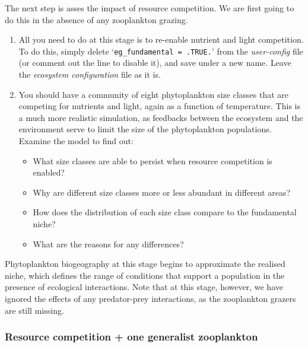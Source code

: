 \documentclass[11pt,fleqn]{book} %
\begin{document}
The next step is asses the impact of resource competition. We are first going to do this in the absence of any zooplankton grazing.

\begin{enumerate}[noitemsep]
\vspace{1mm}
\item All you need to do at this stage is to re-enable nutrient and light competition. To do this, simply delete `\texttt{eg\_fundamental~=~.TRUE.}' from the \textit{user-config} file (or comment out the line to disable it), and save under a new name. Leave the \textit{ecosystem configuration} file as it is.

\vspace{1mm}
\item You should have a community of eight phytoplankton size classes that are competing for nutrients and light, again as a function of temperature. This is a much more realistic simulation, as feedbacks between the ecosystem and the environment serve to limit the size of the phytoplankton populations. \\Examine the model to find out:
\begin{itemize}
\item What size classes are able to persist when resource competition is enabled?
\item Why are different size classes more or less abundant in different areas?
\item How does the distribution of each size class compare to the fundamental niche?
\item What are the reasons for any differences?
\end{itemize}
\end{enumerate}
\vspace{1mm}

Phytoplankton biogeography at this stage begins to approximate the realised niche, which defines the range of conditions that support a population in the presence of ecological interactions. Note that at this stage, however, we have ignored the effects of any predator-prey interactions, as the zooplankton grazers are still missing.


\subsubsection*{Resource competition + one generalist zooplankton}
\end{document}
